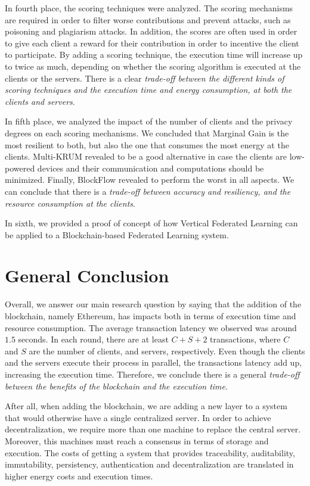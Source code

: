 In fourth place, the scoring techniques were analyzed. The scoring mechanisms are required in order to filter worse contributions and prevent attacks, such as poisoning and plagiarism attacks. In addition, the scores are often used in order to give each client a reward for their contribution in order to incentive the client to participate. By adding a scoring technique, the execution time will increase up to twice as much, depending on whether the scoring algorithm is executed at the clients or the servers. There is a clear \textit{trade-off between the different kinds of scoring techniques and the execution time and energy consumption, at both the clients and servers}.

In fifth place, we analyzed the impact of the number of clients and the privacy degrees on each scoring mechanisms. We concluded that Marginal Gain is the most resilient to both, but also the one that consumes the most energy at the clients. Multi-KRUM revealed to be a good alternative in case the clients are low-powered devices and their communication and computations should be minimized. Finally, BlockFlow revealed to perform the worst in all aspects. We can conclude that there is a \textit{trade-off between accuracy and resiliency, and the resource consumption at the clients}.

In sixth, we provided a proof of concept of how Vertical Federated Learning can be applied to a Blockchain-based Federated Learning system.

\section{General Conclusion}\label{conclusions:general}

Overall, we answer our main research question by saying that the addition of the blockchain, namely Ethereum, has impacts both in terms of execution time and resource consumption. The average transaction latency we observed was around $1.5$ seconds. In each round, there are at least $C+S+2$ transactions, where $C$ and $S$ are the number of clients, and servers, respectively. Even though the clients and the servers execute their process in parallel, the transactions latency add up, increasing the execution time. Therefore, we conclude there is a general \textit{trade-off between the benefits of the blockchain and the execution time}.

After all, when adding the blockchain, we are adding a new layer to a system that would otherwise have a single centralized server. In order to achieve decentralization, we require more than one machine to replace the central server. Moreover, this machines must reach a consensus in terms of storage and execution. The costs of getting a system that provides traceability, auditability, immutability, persistency, authentication and decentralization are translated in higher energy costs and execution times.

